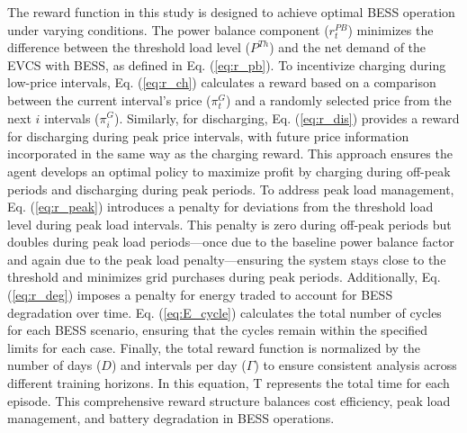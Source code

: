 \documentclass[10pt, journal]{IEEEtran}
\begin{document}
\vspace{-3mm}
The reward function in this study is designed to achieve optimal BESS operation under varying conditions. The power balance component (\( r_t^{PB} \)) minimizes the difference between the threshold load level (\( P^{Th} \)) and the net demand of the EVCS with BESS, as defined in Eq. (\ref{eq:r_pb}). To incentivize charging during low-price intervals, Eq. (\ref{eq:r_ch}) calculates a reward based on a comparison between the current interval's price (\( \pi^G_t \)) and a randomly selected price from the next \( i \) intervals (\( \pi^G_i \)). Similarly, for discharging, Eq. (\ref{eq:r_dis}) provides a reward for discharging during peak price intervals, with future price information incorporated in the same way as the charging reward. This approach ensures the agent develops an optimal policy to maximize profit by charging during off-peak periods and discharging during peak periods. To address peak load management, Eq. (\ref{eq:r_peak}) introduces a penalty for deviations from the threshold load level during peak load intervals. This penalty is zero during off-peak periods but doubles during peak load periods—once due to the baseline power balance factor and again due to the peak load penalty—ensuring the system stays close to the threshold and minimizes grid purchases during peak periods. Additionally, Eq. (\ref{eq:r_deg}) imposes a penalty for energy traded to account for BESS degradation over time. Eq. (\ref{eq:E_cycle}) calculates the total number of cycles for each BESS scenario, ensuring that the cycles remain within the specified limits for each case. Finally, the total reward function is normalized by the number of days (\( D \)) and intervals per day (\( \Gamma \)) to ensure consistent analysis across different training horizons. In this equation, T represents the total time for each episode. This comprehensive reward structure balances cost efficiency, peak load management, and battery degradation in BESS operations.
\end{document}
